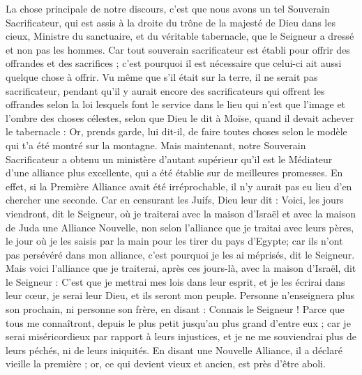 \begin{multicols}{2}
\VerseOne{}La chose principale de notre discours, c'est que nous avons un tel Souverain Sacrificateur, qui est assis à la droite du trône de la majesté de Dieu dans les cieux,
Ministre du sanctuaire, et du véritable tabernacle, que le Seigneur a dressé et non pas les hommes.
Car tout souverain sacrificateur est établi pour offrir des offrandes et des sacrifices ; c'est pourquoi il est nécessaire que celui-ci ait aussi quelque chose à offrir.
Vu même que s'il était sur la terre, il ne serait pas sacrificateur, pendant qu'il y aurait encore des sacrificateurs qui offrent les offrandes selon la loi
lesquels font le service dans le lieu qui n'est que l'image et l'ombre des choses célestes, selon que Dieu le dit à Moïse, quand il devait achever le tabernacle : Or, prends garde, lui dit-il, de faire toutes choses selon le modèle qui t'a été montré sur la montagne.
Mais maintenant, notre Souverain Sacrificateur a obtenu un ministère d'autant supérieur qu'il est le Médiateur d'une alliance plus excellente, qui a été établie sur de meilleures promesses.
En effet, si la Première Alliance avait été irréprochable, il n'y aurait pas eu lieu d'en chercher une seconde.
Car en censurant les Juifs, Dieu leur dit : Voici, les jours viendront, dit le Seigneur, où je traiterai avec la maison d'Israël et avec la maison de Juda une Alliance Nouvelle,
non selon l'alliance que je traitai avec leurs pères, le jour où je les saisis par la main pour les tirer du pays d'Egypte; car ils n'ont pas persévéré dans mon alliance, c'est pourquoi je les ai méprisés, dit le Seigneur.
Mais voici l'alliance que je traiterai, après ces jours-là, avec la maison d'Israël, dit le Seigneur : C'est que je mettrai mes lois dans leur esprit, et je les écrirai dans leur cœur, je serai leur Dieu, et ils seront mon peuple.
Personne n'enseignera plus son prochain, ni personne son frère, en disant : Connais le Seigneur ! Parce que tous me connaîtront, depuis le plus petit jusqu'au plus grand d'entre eux ;
car je serai miséricordieux par rapport à leurs injustices, et je ne me souviendrai plus de leurs péchés, ni de leurs iniquités.
En disant une Nouvelle Alliance, il a déclaré vieille la première ; or, ce qui devient vieux et ancien, est près d'être aboli.

\end{multicols}
